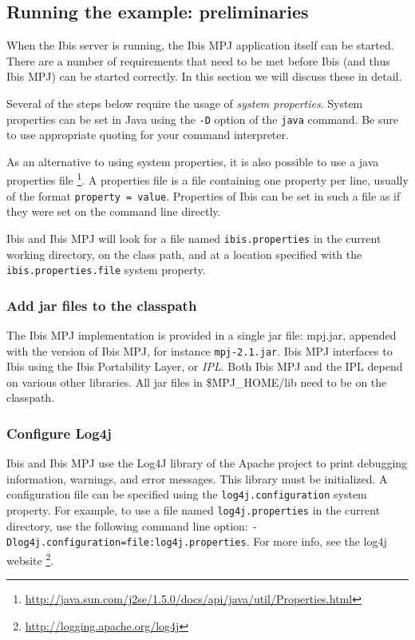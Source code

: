 \documentclass[a4paper,10pt]{article}
\begin{document}
\subsection{Running the example: preliminaries}

When the Ibis server is running, the Ibis MPJ application itself can be
started.  There are a number of requirements that need to be met before
Ibis (and thus Ibis MPJ) can be started correctly.
In this section we will discuss these in detail.

Several of the steps below require the usage of \emph{system properties}.
System properties can be set in Java using the \texttt{-D} option of the
\texttt{java} command. Be sure to use appropriate quoting for your
command interpreter.

As an alternative to using system properties, it is also possible to use
a java properties file
\footnote{\url{http://java.sun.com/j2se/1.5.0/docs/api/java/util/Properties.html}}.
A properties file is a file containing one property per line, usually of
the format \texttt{property = value}. Properties of Ibis can be set in
such a file as if they were set on the command line directly.

Ibis and Ibis MPJ will look for a file named \texttt{ibis.properties} in the
current working directory, on the class path, and at a location specified
with the \texttt{ibis.properties.file} system property.

\subsubsection{Add jar files to the classpath}

The Ibis MPJ implementation is provided in a single jar file: mpj.jar,
appended with the version of Ibis MPJ, for instance \texttt{mpj-2.1.jar}.
Ibis MPJ interfaces to Ibis using the Ibis Portability Layer, or
\emph{IPL}. Both Ibis MPJ and the IPL depend on various other libraries.
All jar files in \$MPJ\_HOME/lib need to be on the classpath.

\subsubsection{Configure Log4j}

Ibis and Ibis MPJ use the Log4J library of the Apache project to print debugging
information, warnings, and error messages. This library must be
initialized. A configuration file can be specified using the
\texttt{log4j.configuration} system property. For example, to use a file
named \texttt{log4j.properties} in the current directory, use the
following command line option:
\texttt{-Dlog4j.configuration=file:log4j.properties}. For more info,
see the log4j website \footnote{\url{http://logging.apache.org/log4j}}.
\end{document}
